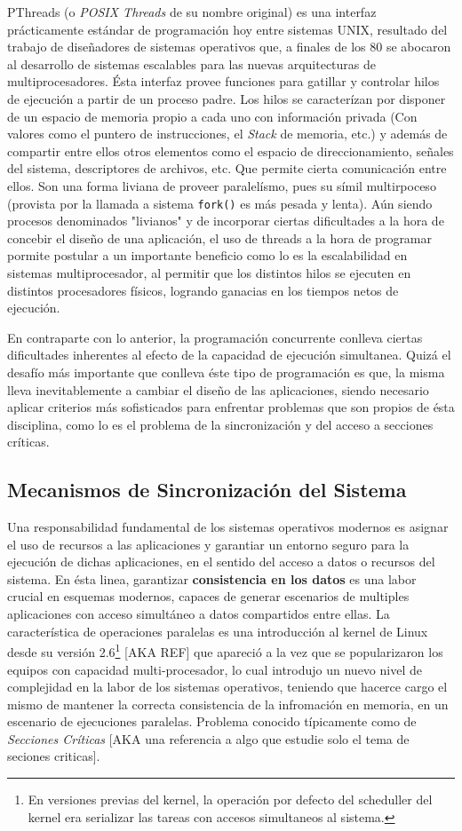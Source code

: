 PThreads (o \emph{POSIX Threads} de su nombre original) es una interfaz prácticamente estándar de programación hoy entre sistemas UNIX, resultado del trabajo de diseñadores de sistemas operativos que, a finales de los 80 se abocaron al desarrollo de sistemas escalables para las nuevas arquitecturas de multiprocesadores. Ésta interfaz provee funciones para gatillar y controlar hilos de ejecución a partir de un proceso padre. Los hilos se caracterízan por disponer de un espacio de memoria propio a cada uno con información privada (Con valores como el puntero de instrucciones, el \emph{Stack} de memoria, etc.) y además de compartir entre ellos otros elementos como el espacio de direccionamiento, señales del sistema, descriptores de archivos, etc. Que permite cierta comunicación entre ellos. Son una forma liviana de proveer paralelísmo, pues su símil multirpoceso (provista por la llamada a sistema \verb=fork()= es más pesada y lenta). Aún siendo procesos denominados "livianos" y de incorporar ciertas dificultades a la hora de concebir el diseño de una aplicación, el uso de threads a la hora de programar pormite postular a un importante beneficio como lo es la escalabilidad en sistemas multiprocesador, al permitir que los distintos hilos se ejecuten en distintos procesadores físicos, logrando ganacias en los tiempos netos de ejecución.

En contraparte con lo anterior, la programación concurrente conlleva ciertas dificultades inherentes al efecto de la capacidad de ejecución simultanea. Quizá el desafío más importante que conlleva éste tipo de programación es que, la misma lleva inevitablemente a cambiar el diseño de las aplicaciones, siendo necesario aplicar criterios más sofisticados para enfrentar problemas que son propios de ésta disciplina, como lo es el problema de la sincronización y del acceso a secciones críticas.


\subsection{Mecanismos de Sincronización del Sistema}
Una responsabilidad fundamental de los sistemas operativos modernos es asignar el uso de recursos a las aplicaciones y garantiar un entorno seguro para la ejecución de dichas aplicaciones, en el sentido del acceso a datos o recursos del sistema. En ésta linea, garantizar \textbf{consistencia en los datos} es una labor crucial en esquemas modernos, capaces de generar escenarios de multiples aplicaciones con acceso simultáneo a datos compartidos entre ellas. La característica de operaciones paralelas es una introducción al kernel de Linux desde su versión 2.6\footnote{En versiones previas del kernel, la operación por defecto del scheduller del kernel era serializar las tareas con accesos simultaneos al sistema.} [AKA REF] que apareció a la vez que se popularizaron los equipos con capacidad multi-procesador, lo cual introdujo un nuevo nivel de complejidad en la labor de los sistemas operativos, teniendo que hacerce cargo el mismo de mantener la correcta consistencia de la infromación en memoria, en un escenario de ejecuciones paralelas. Problema conocido típicamente como de \emph{Secciones Críticas} [AKA una referencia a algo que estudie solo el tema de seciones criticas].

